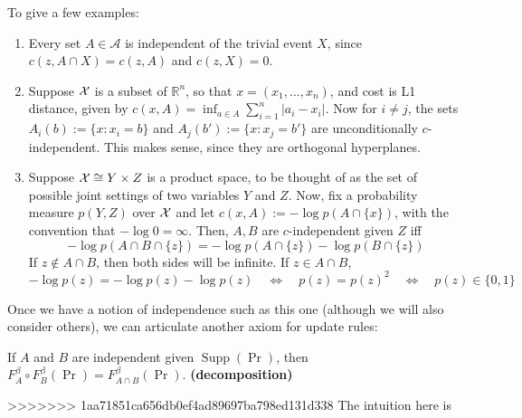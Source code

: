 \documentclass{article}
\DeclareMathOperator{\supp}{\mathrm{Supp}}
\begin{document}
To give a few examples:
\begin{enumerate}
    \item Every set $A \in\mathcal A$ is independent of the trivial event $X$, since 
        $
            c(z, A\cap X) = c(z, A)  
        $
        and $c(z, X) = 0$.
    \item Suppose $\mathcal X$ is a subset of $\mathbb R^n$, so that $x = (x_1, \ldots, x_n)$, and cost is L1 distance, given by $c(x,A) = \inf_{a \in A} \sum_{i=1}^n {|a_i - x_i|}$. Now for $i\ne j$,
    the sets $A_i(b) := \{ x : x_i = b \}$ 
    and $A_j(b') := \{x : x_j = b' \}$ are unconditionally $c$-independent. 
    This makes sense, since they are orthogonal hyperplanes. 

    \item  Suppose $\mathcal X \cong Y \times Z$ is a product space, to be thought of as the set of possible joint settings of two variables $Y$ and $Z$.
    Now, fix a probability measure $p(Y,Z)$ over $\mathcal X$
    and let 
    $c(x, A) := -\log p(A \cap \{x\})$, with the convention that $-\log 0 = \infty$.  
    Then, $A, B$ are $c$-independent given $Z$ iff
    \[
        - \log p(A \cap B \cap \{z\}) = 
        - \log p(A \cap \{z\}) - \log p(B \cap \{z\}) 
    \] 
    If $z \notin A \cap B$, then both sides will be infinite. If $z \in A \cap B$, 
    \[
        - \log p(z) = - \log p(z) - \log p(z) 
        \quad\iff\quad
        p(z) = p(z)^2
        \quad\iff\quad
        p(z) \in \{0,1\}
    \]    
\end{enumerate}

Once we have a notion of independence such as this one (although we will also consider others), we can articulate another axiom for update rules:
\begin{URaxioms}
    \item 
    If $A$ and $B$ are independent given $\supp(\Pr)$, then \\
    $F^{\beta}_A \circ F^{\beta}_B (\Pr) = F^{\beta}_{A \cap B}(\Pr)$.
        \hfill \textbf{(decomposition)}
\end{URaxioms}
>>>>>>> 1aa71851ca656db0ef4ad89697ba798ed131d338
The intuition here is 
\end{document}
